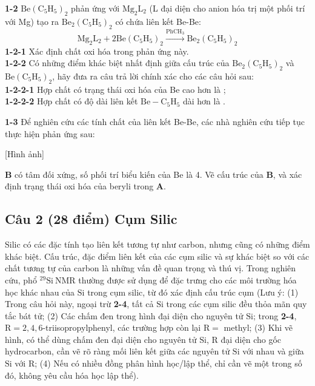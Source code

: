 \vspace{0.2cm}

\noindent
\textbf{1-2} $\mathrm{Be(C_5H_5)_2}$ phản ứng với $\mathrm{Mg_2L_2}$ (L đại diện cho anion hóa trị một phối trí với Mg) tạo ra $\mathrm{Be_2(C_5H_5)_2}$ có chứa liên kết Be-Be:
\[ \mathrm{Mg_2L_2 + 2 Be(C_5H_5)_2 \xrightarrow{PhCH_3} Be_2(C_5H_5)_2} \]
\textbf{1-2-1} Xác định chất oxi hóa trong phản ứng này.\\
\textbf{1-2-2} Có những điểm khác biệt nhất định giữa cấu trúc của $\mathrm{Be_2(C_5H_5)_2}$ và $\mathrm{Be(C_5H_5)_2}$, hãy đưa ra câu trả lời chính xác cho các câu hỏi sau:\\
\textbf{1-2-2-1} Hợp chất có trạng thái oxi hóa của Be cao hơn là \underline{\hspace{3cm}};\\
\textbf{1-2-2-2} Hợp chất có độ dài liên kết $\mathrm{Be-C_5H_5}$ dài hơn là \underline{\hspace{3cm}}.

\vspace{0.2cm}

\noindent
\textbf{1-3} Để nghiên cứu các tính chất của liên kết Be-Be, các nhà nghiên cứu tiếp tục thực hiện phản ứng sau:

\begin{center}
    [Hình ảnh]
\end{center}

\noindent
\textbf{B} có tâm đối xứng, số phối trí biểu kiến của Be là 4. Vẽ cấu trúc của \textbf{B}, và xác định trạng thái oxi hóa của beryli trong \textbf{A}.

\vspace{0.5cm}

\subsection{Câu 2 (28 điểm) Cụm Silic}

Silic có các đặc tính tạo liên kết tương tự như carbon, nhưng cũng có những điểm khác biệt. Cấu trúc, đặc điểm liên kết của các cụm silic và sự khác biệt so với các chất tương tự của carbon là những vấn đề quan trọng và thú vị. Trong nghiên cứu, phổ $\mathrm{^{29}Si\ NMR}$ thường được sử dụng để đặc trưng cho các môi trường hóa học khác nhau của $\mathrm{Si}$ trong cụm silic, từ đó xác định cấu trúc cụm (Lưu ý: (1) Trong câu hỏi này, ngoại trừ \textbf{2-4}, tất cả $\mathrm{Si}$ trong các cụm silic đều thỏa mãn quy tắc bát tử; (2) Các chấm đen trong hình đại diện cho nguyên tử $\mathrm{Si}$; trong \textbf{2-4}, $\mathrm{R = 2,4,6}$-triisopropylphenyl, các trường hợp còn lại $\mathrm{R =}$ methyl; (3) Khi vẽ hình, có thể dùng chấm đen đại diện cho nguyên tử $\mathrm{Si}$, $\mathrm{R}$ đại diện cho gốc hydrocarbon, cần vẽ rõ ràng mối liên kết giữa các nguyên tử $\mathrm{Si}$ với nhau và giữa $\mathrm{Si}$ với $\mathrm{R}$; (4) Nếu có nhiều đồng phân hình học/lập thể, chỉ cần vẽ một trong số đó, không yêu cầu hóa học lập thể).

